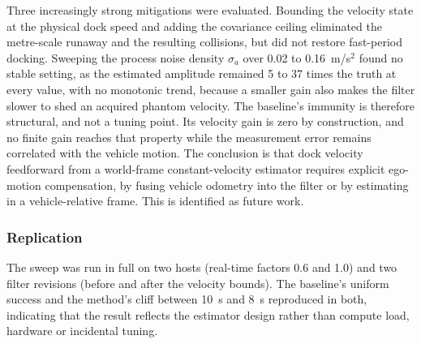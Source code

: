 Three increasingly strong mitigations were evaluated. Bounding the velocity state at the physical dock speed and adding the covariance ceiling eliminated the metre-scale runaway and the resulting collisions, but did not restore fast-period docking. Sweeping the process noise density $\sigma_a$ over 0.02 to 0.16~m/s$^2$ found no stable setting, as the estimated amplitude remained 5 to 37 times the truth at every value, with no monotonic trend, because a smaller gain also makes the filter slower to shed an acquired phantom velocity. The baseline's immunity is therefore structural, and not a tuning point. Its velocity gain is zero by construction, and no finite gain reaches that property while the measurement error remains correlated with the vehicle motion. The conclusion is that dock velocity feedforward from a world-frame constant-velocity estimator requires explicit ego-motion compensation, by fusing vehicle odometry into the filter or by estimating in a vehicle-relative frame. This is identified as future work.

\subsubsection{Replication}

The sweep was run in full on two hosts (real-time factors 0.6 and 1.0) and two filter revisions (before and after the velocity bounds). The baseline's uniform success and the method's cliff between 10~s and 8~s reproduced in both, indicating that the result reflects the estimator design rather than compute load, hardware or incidental tuning.
